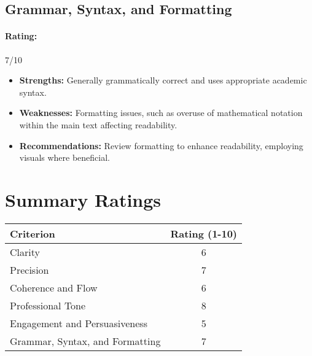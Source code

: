 \documentclass{article}
\begin{document}
\subsection{Grammar, Syntax, and Formatting}
\paragraph{Rating:} 7/10
\begin{itemize}
    \item \textbf{Strengths:} Generally grammatically correct and uses appropriate academic syntax.
    \item \textbf{Weaknesses:} Formatting issues, such as overuse of mathematical notation within the main text affecting readability.
    \item \textbf{Recommendations:} Review formatting to enhance readability, employing visuals where beneficial.
\end{itemize}

\section{Summary Ratings}

\begin{center}
\begin{tabular}{l c}
\toprule
Criterion & Rating (1-10) \\
\midrule
Clarity & 6 \\
Precision & 7 \\
Coherence and Flow & 6 \\
Professional Tone & 8 \\
Engagement and Persuasiveness & 5 \\
Grammar, Syntax, and Formatting & 7 \\
\bottomrule
\end{tabular}
\end{center}
\end{document}

